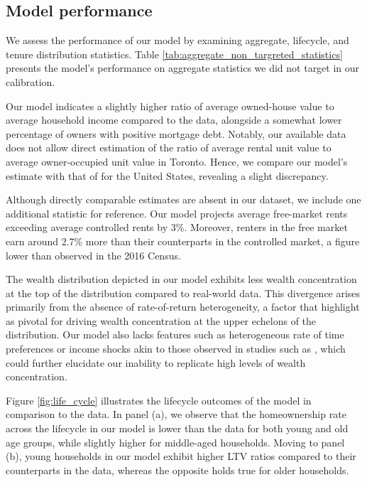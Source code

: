 \documentclass[parskip=full]{article}
\begin{document}
\subsection{Model performance}\label{subsection:non_targeted_statistics}

We assess the performance of our model by examining aggregate, lifecycle, and tenure distribution statistics. Table \ref{tab:aggregate_non_targreted_statistics} presents the model's performance on aggregate statistics we did not target in our calibration.

Our model indicates a slightly higher ratio of average owned-house value to average household income compared to the data, alongside a somewhat lower percentage of owners with positive mortgage debt. Notably, our available data does not allow direct estimation of the ratio of average rental unit value to average owner-occupied unit value in Toronto. Hence, we compare our model's estimate with that of \citet{chatterjee-eyigungor-2015} for the United States, revealing a slight discrepancy.

Although directly comparable estimates are absent in our dataset, we include one additional statistic for reference. Our model projects average free-market rents exceeding average controlled rents by 3\%. Moreover, renters in the free market earn around 2.7\% more than their counterparts in the controlled market, a figure lower than observed in the 2016 Census.

The wealth distribution depicted in our model exhibits less wealth concentration at the top of the distribution compared to real-world data. This divergence arises primarily from the absence of rate-of-return heterogeneity, a factor that \citet{fagereng} highlight as pivotal for driving wealth concentration at the upper echelons of the distribution. Our model also lacks features such as heterogeneous rate of time preferences \citep{ks-1998} or income shocks akin to those observed in studies such as \citet{mj-shocks}, which could further elucidate our inability to replicate high levels of wealth concentration.

Figure \ref{fig:life_cycle} illustrates the lifecycle outcomes of the model in comparison to the data. In panel (a), we observe that the homeownership rate across the lifecycle in our model is lower than the data for both young and old age groups, while slightly higher for middle-aged households. Moving to panel (b), young households in our model exhibit higher LTV ratios compared to their counterparts in the data, whereas the opposite holds true for older households.
\end{document}
